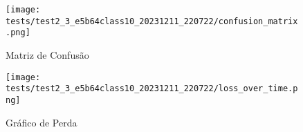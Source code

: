 \begin{figure}[ht]
 \begin{center}
   \texttt{[image: tests/test2\_3\_e5b64class10\_20231211\_220722/confusion\_matrix.png]}
  \caption{Matriz de Confusão}
  \label{fig:fig03}
 \end{center}
\end{figure}

\begin{figure}[ht]
 \begin{center}
   \texttt{[image: tests/test2\_3\_e5b64class10\_20231211\_220722/loss\_over\_time.png]}
  \caption{Gráfico de Perda}
  \label{fig:fig04}
 \end{center}
\end{figure}
